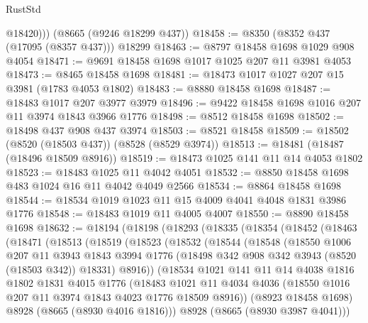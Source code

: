 \begin{lexlean}{RustStd}
\begin{coremodule}
          @18420)))
    (@8665 (@9246 @18299 @437))
@18458 := @8350 (@8352 @437 (@17095 (@8357 @437))) @18299
@18463 := @8797 @18458 @1698 @1029 @908 @4054
@18471 := @9691 @18458 @1698 @1017 @1025 @207 @11 @3981 @4053
@18473 := @8465 @18458 @1698
@18481 := @18473 @1017 @1027 @207 @15 @3981 (@1783 @4053 @1802)
@18483 := @8880 @18458 @1698
@18487 := @18483 @1017 @207 @3977 @3979
@18496 := @9422 @18458 @1698 @1016 @207 @11 @3974 @1843 @3966 @1776
@18498 := @8512 @18458 @1698
@18502 := @18498 @437 @908 @437 @3974
@18503 := @8521 @18458
@18509 := @18502 (@8520 (@18503 @437)) (@8528 (@8529 @3974))
@18513 := @18481 (@18487 (@18496 @18509 @8916))
@18519 := @18473 @1025 @141 @11 @14 @4053 @1802
@18523 := @18483 @1025 @11 @4042 @4051
@18532 := @8850 @18458 @1698 @483 @1024 @16 @11 @4042 @4049 @2566
@18534 := @8864 @18458 @1698
@18544 := @18534 @1019 @1023 @11 @15 @4009 @4041 @4048 @1831 @3986 @1776
@18548 := @18483 @1019 @11 @4005 @4007
@18550 := @8890 @18458 @1698
@18632 := @18194
    (@18198
      (@18293
        (@18335
          (@18354
            (@18452
              (@18463
                (@18471
                  (@18513
                    (@18519
                      (@18523
                        (@18532
                          (@18544
                            (@18548
                              (@18550
                                @1006
                                @207
                                @11
                                @3943
                                @1843
                                @3994
                                @1776
                                (@18498 @342 @908 @342 @3943 (@8520 (@18503 @342)) @18331)
                                @8916))
                            (@18534
                              @1021
                              @141
                              @11
                              @14
                              @4038
                              @1816
                              @1802
                              @1831
                              @4015
                              @1776
                              (@18483
                                @1021
                                @11
                                @4034
                                @4036
                                (@18550 @1016 @207 @11 @3974 @1843 @4023 @1776 @18509 @8916))
                              (@8923 @18458 @1698)
                              @8928
                              (@8665 (@8930 @4016 @1816)))
                            @8928
                            (@8665 (@8930 @3987 @4041)))

\end{coremodule}
\end{lexlean}
